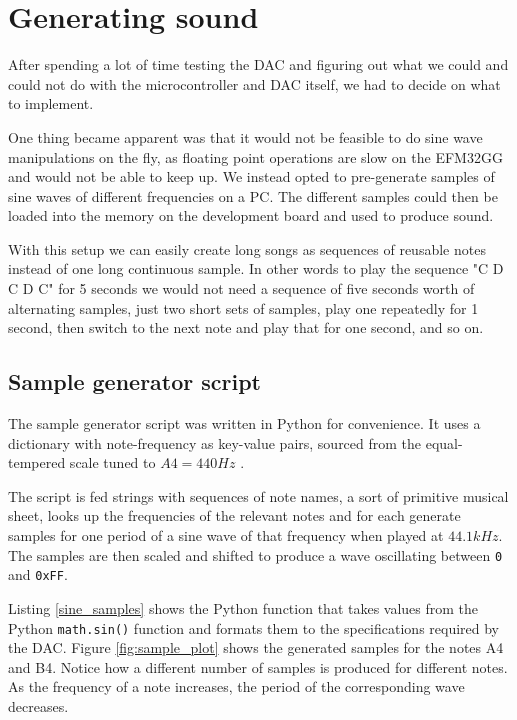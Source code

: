 \section{Generating sound}\label{sec:sound}
After spending a lot of time testing the DAC and figuring out what we could and could not do with the microcontroller and DAC itself, we had to decide on what to implement.

One thing became apparent was that it would not be feasible to do sine wave manipulations on the fly, as floating point operations are slow on the EFM32GG and would not be able to keep up. We instead opted to pre-generate samples of sine waves of different frequencies on a PC. The different samples could then be loaded into the memory on the development board and used to produce sound.

With this setup we can easily create long songs as sequences of reusable notes instead of one long continuous sample. In other words to play the sequence "C D C D C" for 5 seconds we would not need a sequence of five seconds worth of alternating samples, just two short sets of samples, play one repeatedly for 1 second, then switch to the next note and play that for one second, and so on.

\subsection{Sample generator script}
The sample generator script was written in Python for convenience. It uses a dictionary with note-frequency as key-value pairs, sourced from the equal-tempered scale tuned to $A4 = 440Hz$ \cite{notefreqs}.

The script is fed strings with sequences of note names, a sort of primitive musical sheet, looks up the frequencies of the relevant notes and for each generate samples for one period of a sine wave of that frequency when played at $44.1kHz$. The samples are then scaled and shifted to produce a wave oscillating between \texttt{0} and \texttt{0xFF}. 

Listing \ref{sine_samples} shows the Python function that takes values from the Python \texttt{math.sin()} function and formats them to the specifications required by the DAC. Figure \ref{fig:sample_plot} shows the generated samples for the notes A4 and B4. Notice how a different number of samples is produced for different notes. As the frequency of a note increases, the period of the corresponding wave decreases.


